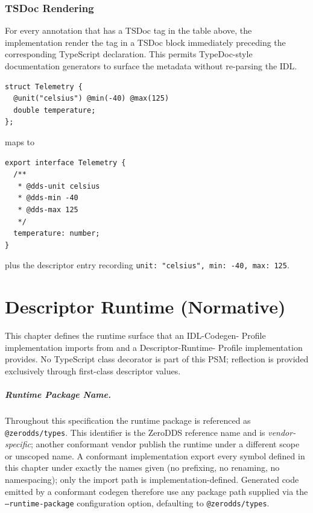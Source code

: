 \documentclass{../styles/zerodds-vendor-spec}
\begin{document}
\subsection{TSDoc Rendering}

For every annotation that has a TSDoc tag in the table above, the
implementation  render the tag in a TSDoc block
immediately preceding the corresponding TypeScript declaration.
This permits TypeDoc-style documentation generators to surface the
metadata without re-parsing the IDL.

\begin{specexample}
\begin{lstlisting}
struct Telemetry {
  @unit("celsius") @min(-40) @max(125)
  double temperature;
};
\end{lstlisting}
maps to
\begin{lstlisting}
export interface Telemetry {
  /**
   * @dds-unit celsius
   * @dds-min -40
   * @dds-max 125
   */
  temperature: number;
}
\end{lstlisting}
plus the descriptor entry recording \texttt{unit:\,"celsius",
min:\,-40, max:\,125}.
\end{specexample}

\chapter{Descriptor Runtime (Normative)}\label{ch:descriptor-runtime}

This chapter defines the runtime surface that an IDL-Codegen-
Profile implementation imports from and a Descriptor-Runtime-
Profile implementation provides. No TypeScript class decorator is
part of this PSM; reflection is provided exclusively through
first-class descriptor values.

\paragraph{Runtime Package Name.} Throughout this specification
the runtime package is referenced as \texttt{@zerodds/types}.
This identifier is the ZeroDDS reference name and is
\emph{vendor-specific}; another conformant vendor 
publish the runtime under a different scope or unscoped name. A
conformant implementation  export every symbol
defined in this chapter under exactly the names given (no
prefixing, no renaming, no namespacing); only the import path is
implementation-defined. Generated code emitted by a conformant
codegen  therefore use any package path supplied via
the \texttt{--runtime-package} configuration option, defaulting to
\texttt{@zerodds/types}.
\end{document}
